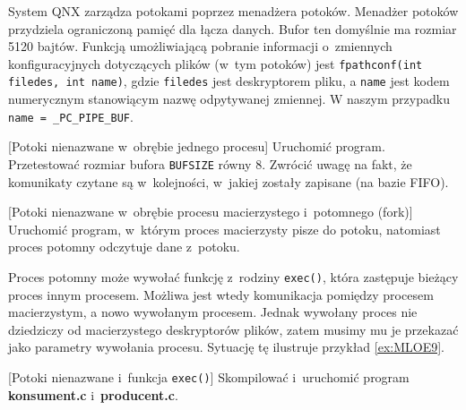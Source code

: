 System QNX zarządza potokami poprzez menadżera potoków. Menadżer potoków
przydziela ograniczoną pamięć dla łącza danych. Bufor ten domyślnie ma rozmiar
5120 bajtów. Funkcją umożliwiającą pobranie informacji o~zmiennych
konfiguracyjnych dotyczących plików (w~tym potoków) jest \texttt{fpathconf(int
filedes, int name)}, gdzie \texttt{filedes} jest deskryptorem pliku, a
\texttt{name} jest kodem numerycznym stanowiącym nazwę odpytywanej zmiennej. W
naszym przypadku \texttt{name = \_PC\_PIPE\_BUF}.

\begin{example}{[Potoki nienazwane w~obrębie jednego procesu]}
  Uruchomić program. Przetestować rozmiar bufora \texttt{BUFSIZE} równy $8$.
  Zwrócić uwagę na fakt, że komunikaty czytane są w~kolejności, w~jakiej
  zostały zapisane (na bazie FIFO).
  
\end{example}

\begin{example}{[Potoki nienazwane w~obrębie procesu macierzystego i~potomnego (fork)]}
  Uruchomić program, w~którym proces macierzysty pisze do potoku, natomiast
  proces potomny odczytuje dane z~potoku.
  
\end{example}

Proces potomny może wywołać funkcję z~rodziny \texttt{exec()}, która zastępuje
bieżący proces innym procesem. Możliwa jest wtedy komunikacja pomiędzy procesem
macierzystym, a nowo wywołanym procesem. Jednak wywołany proces nie dziedziczy
od macierzystego deskryptorów plików, zatem musimy mu je przekazać jako
parametry wywołania procesu. Sytuację tę ilustruje przykład \ref{ex:MLOE9}.
\begin{example}{[Potoki nienazwane i~funkcja \texttt{exec()}]}
  \label{ex:MLOE9}
  Skompilować i~uruchomić program \textbf{konsument.c} i~\textbf{producent.c}.
  
  
\end{example}

